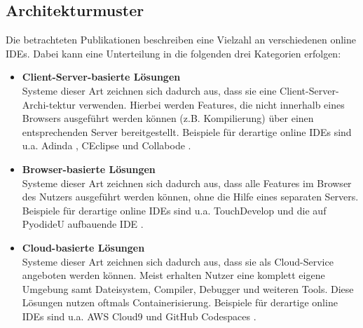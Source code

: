 \subsection{Architekturmuster}\label{section:stand-der-technik:literaturrecherche:architekturmuster}

Die betrachteten Publikationen beschreiben eine Vielzahl an verschiedenen online IDEs. Dabei kann eine Unterteilung in die folgenden drei Kategorien erfolgen:

\begin{itemize}
      \item \textbf{Client-Server-basierte Lösungen} \\
            Systeme dieser Art zeichnen sich dadurch aus, dass sie eine Client-Server-Archi-tektur verwenden. Hierbei werden Features, die nicht innerhalb eines Browsers ausgeführt werden können (z.B. Kompilierung) über einen entsprechenden Server bereitgestellt. Beispiele für derartige online IDEs sind u.a. Adinda \cite{van_deursen_adinda_2010}, CEclipse \cite{wu_ceclipse_2011} und Collabode \cite{goldman_real-time_2011}.
      \item \textbf{Browser-basierte Lösungen} \\
            Systeme dieser Art zeichnen sich dadurch aus, dass alle Features im Browser des Nutzers ausgeführt werden können, ohne die Hilfe eines separaten Servers. Beispiele für derartige online IDEs sind u.a. TouchDevelop \cite{ball_beyond_2015} und die auf PyodideU aufbauende IDE \cite{jefferson_pyodideu_2024}.
      \item \textbf{Cloud-basierte Lösungen} \\
            Systeme dieser Art zeichnen sich dadurch aus, dass sie als Cloud-Service angeboten werden können. Meist erhalten Nutzer eine komplett eigene Umgebung samt Dateisystem, Compiler, Debugger und weiteren Tools. Diese Lösungen nutzen oftmals Containerisierung. Beispiele für derartige online IDEs sind u.a. AWS Cloud9 \cite{noauthor_aws-cloud9_nodate} und GitHub Codespaces \cite{noauthor_github-codespaces_2024}.
\end{itemize}